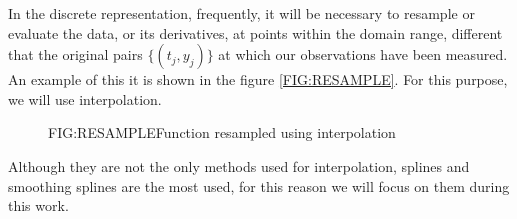 
In the discrete representation, frequently, it will be necessary to resample or
evaluate the data, or its derivatives, at points within the domain range,
different that the original pairs $\{(t_j, y_j)\}$ at which our observations
have been measured. An example of this it is shown in the figure
\ref{FIG:RESAMPLE}. For this purpose, we will use interpolation.

\begin{figure}[Function resampled using interpolation]{FIG:RESAMPLE}{Function resampled using interpolation}
  
   \quad
\end{figure}

Although they are not the only methods used for interpolation, splines and
smoothing splines are the most used, for this reason we will focus on them
during this work.
